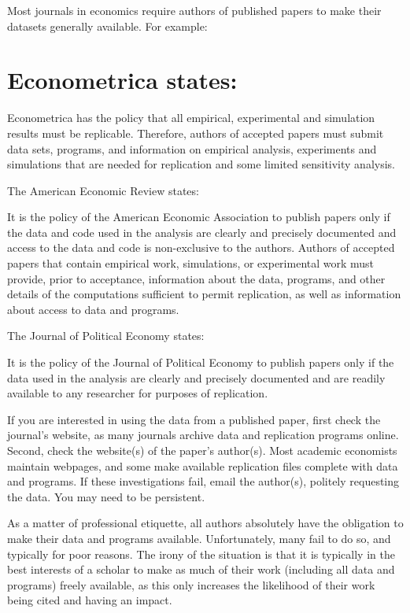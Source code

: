 \documentclass[10pt]{article}
\begin{document}
Most journals in economics require authors of published papers to make their datasets generally available. For example:

\section{Econometrica states:}
Econometrica has the policy that all empirical, experimental and simulation results must be replicable. Therefore, authors of accepted papers must submit data sets, programs, and information on empirical analysis, experiments and simulations that are needed for replication and some limited sensitivity analysis.

The American Economic Review states:

It is the policy of the American Economic Association to publish papers only if the data and code used in the analysis are clearly and precisely documented and access to the data and code is non-exclusive to the authors. Authors of accepted papers that contain empirical work, simulations, or experimental work must provide, prior to acceptance, information about the data, programs, and other details of the computations sufficient to permit replication, as well as information about access to data and programs.

The Journal of Political Economy states:

It is the policy of the Journal of Political Economy to publish papers only if the data used in the analysis are clearly and precisely documented and are readily available to any researcher for purposes of replication.

If you are interested in using the data from a published paper, first check the journal's website, as many journals archive data and replication programs online. Second, check the website(s) of the paper's author(s). Most academic economists maintain webpages, and some make available replication files complete with data and programs. If these investigations fail, email the author(s), politely requesting the data. You may need to be persistent.

As a matter of professional etiquette, all authors absolutely have the obligation to make their data and programs available. Unfortunately, many fail to do so, and typically for poor reasons. The irony of the situation is that it is typically in the best interests of a scholar to make as much of their work (including all data and programs) freely available, as this only increases the likelihood of their work being cited and having an impact.
\end{document}
